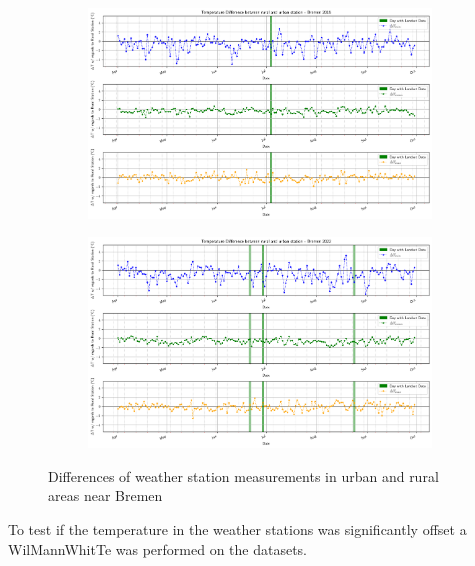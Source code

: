 \documentclass[12pt,a4paper, english,twoside]{article}
\begin{document}
%
    \begin{figure}[!p]
     \centering
       \begin{subfigure}[b]{\textwidth}
        \includegraphics[width=\textwidth]{img/BremenDifferences2015.png}
        \label{fig:diff2015Bre}
       \end{subfigure}
       \begin{subfigure}[b]{\textwidth}
        \includegraphics[width=\textwidth]{img/BremenDifferences2022.png}
        \label{fig:diff20222Bre}
       \end{subfigure}
         \caption{Differences of weather station measurements in urban and rural areas near Bremen}\label{fig:diffBre}
   \end{figure}
   To test if the temperature in the weather stations was significantly offset a \gls{WilMannWhitTe} was performed on the datasets.
%
\end{document}
